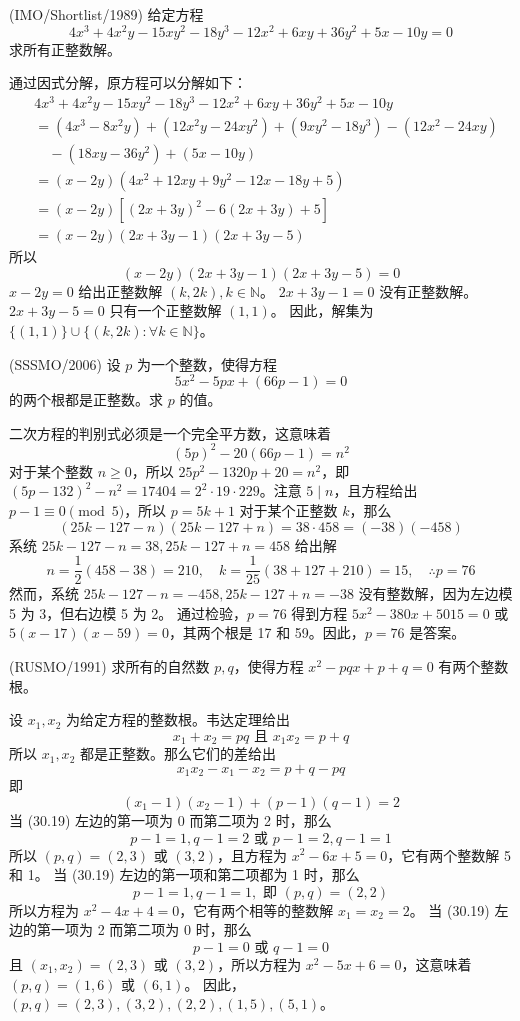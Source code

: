 \begin{questions}
\question (IMO/Shortlist/1989) 给定方程
\[
4x^3+4x^2y-15xy^2-18y^3-12x^2+6xy+36y^2+5x-10y=0
\]
求所有正整数解。

\begin{solution}
通过因式分解，原方程可以分解如下：
\begin{align*}
& 4x^3+4x^2y-15xy^2-18y^3-12x^2+6xy+36y^2+5x-10y \\
&= (4x^3-8x^2y)+(12x^2y-24xy^2)+(9xy^2-18y^3)-(12x^2-24xy) \\
&\quad -(18xy-36y^2)+(5x-10y) \\
&= (x-2y)(4x^2+12xy+9y^2-12x-18y+5) \\
&= (x-2y)\left[ (2x+3y)^2-6(2x+3y)+5 \right] \\
&= (x-2y)(2x+3y-1)(2x+3y-5)
\end{align*}
所以
\[
(x-2y)(2x+3y-1)(2x+3y-5)=0
\]
$x-2y=0$ 给出正整数解 $(k,2k), k \in \mathbb{N}$。
$2x+3y-1=0$ 没有正整数解。
$2x+3y-5=0$ 只有一个正整数解 $(1,1)$。
因此，解集为 $\{(1,1)\} \cup \{(k,2k) : \forall k \in \mathbb{N}\}$。
\end{solution}

\question (SSSMO/2006) 设 $p$ 为一个整数，使得方程
\[
5x^2-5px+(66p-1)=0
\]
的两个根都是正整数。求 $p$ 的值。

\begin{solution}
二次方程的判别式必须是一个完全平方数，这意味着
\[
(5p)^2-20(66p-1)=n^2
\]
对于某个整数 $n \ge 0$，所以 $25p^2-1320p+20=n^2$，即 $(5p-132)^2-n^2=17404=2^2 \cdot 19 \cdot 229$。注意 $5 \mid n$，且方程给出 $p-1 \equiv 0 \pmod{5}$，所以 $p=5k+1$ 对于某个正整数 $k$，那么
\[
(25k-127-n)(25k-127+n)=38 \cdot 458 = (-38)(-458)
\]
系统 $25k-127-n=38, 25k-127+n=458$ 给出解
\[
n=\frac{1}{2}(458-38)=210, \quad k=\frac{1}{25}(38+127+210)=15, \quad \therefore p=76
\]
然而，系统 $25k-127-n=-458, 25k-127+n=-38$ 没有整数解，因为左边模 5 为 3，但右边模 5 为 2。
通过检验，$p=76$ 得到方程 $5x^2-380x+5015=0$ 或 $5(x-17)(x-59)=0$，其两个根是 17 和 59。因此，$p=76$ 是答案。
\end{solution}

\question (RUSMO/1991) 求所有的自然数 $p, q$，使得方程 $x^2-pqx+p+q=0$ 有两个整数根。

\begin{solution}
设 $x_1, x_2$ 为给定方程的整数根。韦达定理给出
\[
x_1+x_2=pq \text{ 且 } x_1x_2=p+q
\]
所以 $x_1, x_2$ 都是正整数。那么它们的差给出
\[
x_1x_2-x_1-x_2=p+q-pq
\]
即
\[
(x_1-1)(x_2-1)+(p-1)(q-1)=2 \tag{30.19}
\]
当 (30.19) 左边的第一项为 0 而第二项为 2 时，那么
\[
p-1=1, q-1=2 \text{ 或 } p-1=2, q-1=1
\]
所以 $(p,q)=(2,3)$ 或 $(3,2)$，且方程为 $x^2-6x+5=0$，它有两个整数解 5 和 1。
当 (30.19) 左边的第一项和第二项都为 1 时，那么
\[
p-1=1, q-1=1, \text{ 即 } (p,q)=(2,2)
\]
所以方程为 $x^2-4x+4=0$，它有两个相等的整数解 $x_1=x_2=2$。
当 (30.19) 左边的第一项为 2 而第二项为 0 时，那么
\[
p-1=0 \text{ 或 } q-1=0
\]
且 $(x_1,x_2)=(2,3)$ 或 $(3,2)$，所以方程为 $x^2-5x+6=0$，这意味着 $(p,q)=(1,6)$ 或 $(6,1)$。
因此，$(p,q)=(2,3), (3,2), (2,2), (1,5), (5,1)$。
\end{solution}


\end{questions}

